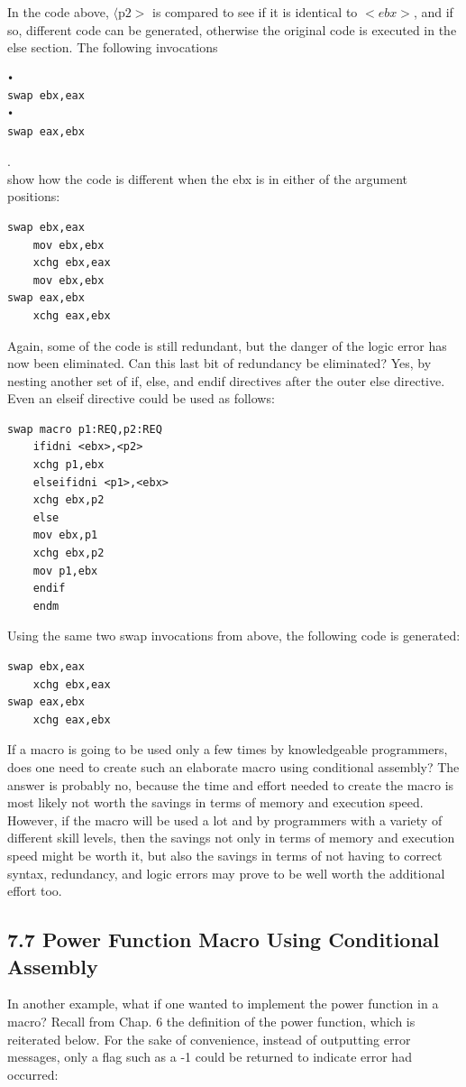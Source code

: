 \documentclass[10pt]{book}
\begin{document}
\begin{center}
\begin{center}
In the code above, $\langle\mathrm{p} 2>$ is compared to see if it is identical to $<e b x>$, and if so, different code can be generated, otherwise the original code is executed in the else section. The following invocations

\begin{verbatim}
•
swap ebx,eax
•
swap eax,ebx
\end{verbatim}

.\\
show how the code is different when the ebx is in either of the argument positions:

\begin{verbatim}
swap ebx,eax
    mov ebx,ebx
    xchg ebx,eax
    mov ebx,ebx
swap eax,ebx
    xchg eax,ebx
\end{verbatim}

Again, some of the code is still redundant, but the danger of the logic error has now been eliminated. Can this last bit of redundancy be eliminated? Yes, by nesting another set of if, else, and endif directives after the outer else directive. Even an elseif directive could be used as follows:

\begin{verbatim}
swap macro p1:REQ,p2:REQ
    ifidni <ebx>,<p2>
    xchg p1,ebx
    elseifidni <p1>,<ebx>
    xchg ebx,p2
    else
    mov ebx,p1
    xchg ebx,p2
    mov p1,ebx
    endif
    endm
\end{verbatim}

Using the same two swap invocations from above, the following code is generated:

\begin{verbatim}
swap ebx,eax
    xchg ebx,eax
swap eax,ebx
    xchg eax,ebx
\end{verbatim}

If a macro is going to be used only a few times by knowledgeable programmers, does one need to create such an elaborate macro using conditional assembly? The answer is probably no, because the time and effort needed to create the macro is most likely not worth the savings in terms of memory and execution speed. However, if the macro will be used a lot and by programmers with a variety of different skill levels, then the savings not only in terms of memory and execution speed might be worth it, but also the savings in terms of not having to correct syntax, redundancy, and logic errors may prove to be well worth the additional effort too.

\subsection*{7.7 Power Function Macro Using Conditional Assembly}
In another example, what if one wanted to implement the power function in a macro? Recall from Chap. 6 the definition of the power function, which is reiterated below. For the sake of convenience, instead of outputting error messages, only a flag such as a -1 could be returned to indicate error had occurred:


\end{center}
\end{center}
\end{document}
